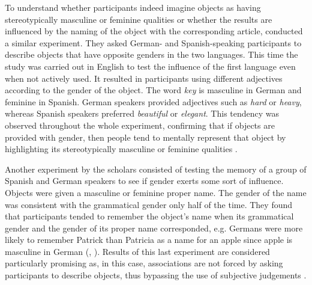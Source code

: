 To understand whether participants indeed imagine objects as having stereotypically masculine or feminine qualities or whether the results are influenced by the naming of the object with the corresponding article, \textcite{phillips2003can} conducted a similar experiment. They asked German- and Spanish-speaking participants to describe objects that have opposite genders in the two languages. This time the study was carried out in English to test the influence of the first language even when not actively used. It resulted in participants using different adjectives according to the gender of the object. The word \textit{key} is masculine in German and feminine in Spanish. German speakers provided adjectives such as \textit{hard} or \textit{heavy}, whereas Spanish speakers preferred \textit{beautiful} or \textit{elegant}. This tendency was observed throughout the whole experiment, confirming that if objects are provided with gender, then people tend to mentally represent that object by highlighting its stereotypically masculine or feminine qualities \citep[65]{boroditsky2003sex}. %

Another experiment by the scholars consisted of testing the memory of a group of Spanish and German speakers to see if gender exerts some sort of influence. Objects were given a masculine or feminine proper name. The gender of the name was consistent with the grammatical gender only half of the time. They found that participants tended to remember the object’s name when its grammatical gender and the gender of its proper name corresponded, e.g. Germans were more likely to remember Patrick than Patricia as a name for an apple since apple is masculine in German (\cite[929]{phillips2003can}, \cite[68]{boroditsky2003sex}). Results of this last experiment are considered particularly promising as, in this case, associations are not forced by asking participants to describe objects, thus bypassing the use of subjective judgements \citep[212--213]{deutscher2010through}.

